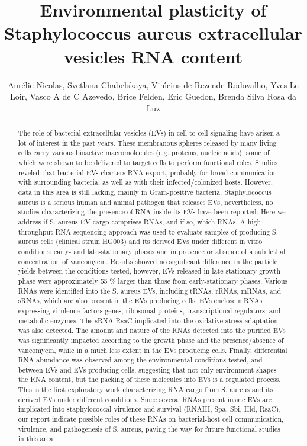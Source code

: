 \documentclass[twoside]{article}
\title{\vspace{-15mm}\fontsize{24pt}{10pt}\selectfont\textbf{ Environmental plasticity of Staphylococcus aureus extracellular vesicles RNA content }} %
\author{ Aur\'elie Nicolas,  Svetlana Chabelskaya,  Vin\'{\i}cius de Rezende Rodovalho,  Yves Le Loir,  Vasco A de C Azevedo,  Brice Felden,  Eric Guedon,  Brenda Silva Rosa da Luz }
\affil{ INAPG- Fran\c{c}a,  UNIVERSIDADE FEDERAL DE MINAS GERAIS }
\date{}
\begin{document}
  
  
  \maketitle %
  
  
  \thispagestyle{fancy} %
  
  
  \begin{abstract}
  The role of bacterial extracellular vesicles (EVs) in cell-to-cell signaling have arisen a lot of interest in the past years. These membranous spheres released by many living cells carry various bioactive macromolecules (e.g. proteins,  nucleic acids),  some of which were shown to be delivered to target cells to perform functional roles. Studies reveled that bacterial EVs charters RNA export,  probably for broad communication with surrounding bacteria,  as well as with their infected/colonized hosts. However,  data in this area is still lacking,  mainly in Gram-positive bacteria. Staphylococcus aureus is a serious human and animal pathogen that releases EVs,  nevertheless,  no studies characterizing the presence of RNA inside its EVs have been reported. Here we address if S. aureus EV cargo comprises RNAs,  and if so,  which RNAs. A high-throughput RNA sequencing approach was used to evaluate samples of producing S. aureus cells (clinical strain HG003) and its derived EVs under different in vitro conditions: early- and late-stationary phases and in presence or absence of a sub lethal concentration of vancomycin. Results showed no significant difference in the particle yields between the conditions tested,  however,  EVs released in late-stationary growth phase were approximately 55 \% larger than those from early-stationary phases. Various RNAs were identified into the S. aureus EVs,  including tRNAs,  rRNAs,  mRNAs,  and sRNAs,  which are also present in the EVs producing cells. EVs enclose mRNAs expressing virulence factors genes,  ribosomal proteins,  transcriptional regulators,  and metabolic enzymes. The sRNA RsaC implicated into the oxidative stress adaptation was also detected. The amount and nature of the RNAs detected into the purified EVs was significantly impacted according to the growth phase and the presence/absence of vancomycin,  while in a much less extent in the EVs producing cells. Finally,  differential  RNA abundance was observed among the environmental conditions tested,  and between EVs and EVs producing cells,  suggesting that not only environment shapes the RNA content,  but the packing of these molecules into EVs is a regulated process. This is the first exploratory work characterizing RNA cargo from S. aureus and its derived EVs under different conditions. Since several RNAs present inside EVs are implicated into staphylococcal virulence and survival (RNAIII,  Spa,  Sbi,  Hld,  RsaC),  our report indicate possible roles of these RNAs on bacterial-host cell communication,  virulence,  and pathogenesis of S. aureus,  paving the way for future functional studies in this area.
  

\end{abstract}
\end{document}
